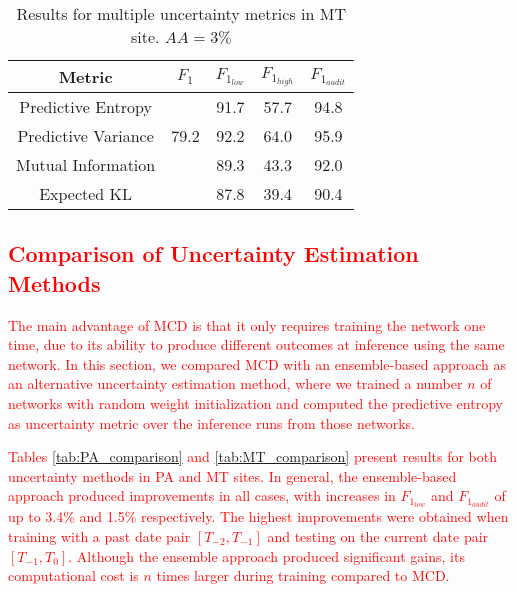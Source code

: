 \begin{table}[ht!]
\caption{Results for multiple uncertainty metrics in MT site. $AA=3\%$} 
\centering
\begin{tabular}{c|c|ccc}
\hline
\textbf{Metric}     & \textbf{$F_1$} & \textbf{$F_{1_{low}}$} & \textbf{$F_{1_{high}}$} & \textbf{$F_{1_{audit}}$} \\ \hline
Predictive Entropy  & \multirow{3}{*}{79.2} & 91.7                 & 57.7                  & 94.8                     \\
Predictive Variance &                       & 92.2                 & 64.0                  & 95.9                   \\
Mutual Information  &                       & 89.3                 & 43.3                  & 92.0                   \\
Expected KL  &                       & 87.8                 & 39.4                  & 90.4                   \\ \hline
\end{tabular}
\label{tab:MT_uncertainty_metrics}
\end{table}
\fi

\iffalse
\textcolor{red}{\subsection{Comparison of Uncertainty Estimation Methods}\label{sec:results_methods}}

\textcolor{red}{The main advantage of MCD is that it only requires training the network one time, due to its ability to produce different outcomes at inference using the same network. In this section, we compared MCD with an ensemble-based approach as an alternative uncertainty estimation method, where we trained a number $n$ of networks with random weight initialization and computed the predictive entropy as uncertainty metric over the inference runs from those networks.} 

\textcolor{red}{Tables \ref{tab:PA_comparison} and \ref{tab:MT_comparison} present results for both uncertainty methods in PA and MT sites. In general, the ensemble-based approach produced improvements in all cases, with increases in $F_{1_{low}}$ and $F_{1_{audit}}$ of up to 3.4\% and 1.5\% respectively. The highest improvements were obtained when training with a past date pair $[T_{-2}, T_{-1}]$ and testing on the current date pair $[T_{-1}, T_0]$. Although the ensemble approach produced significant gains, its computational cost is $n$ times larger during training compared to MCD.}



